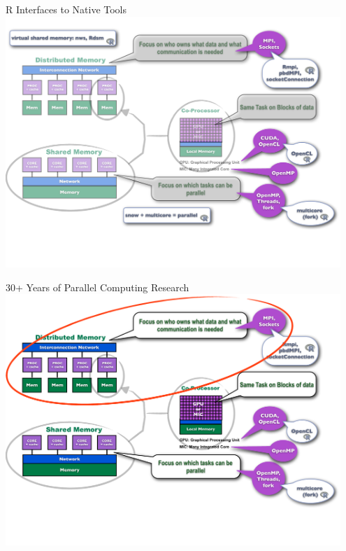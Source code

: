 \begin{frame}
  \begin{block}{R Interfaces to Native Tools}
    \includegraphics[width=0.95\textwidth]{../common/pics/ParallelHardware7.pdf}
  \end{block}
\end{frame}

\begin{frame}
  \begin{block}{30+ Years of Parallel Computing Research}
    \includegraphics[width=0.95\textwidth]{../common/pics/ParallelHardware8.pdf}
  \end{block}
\end{frame}

